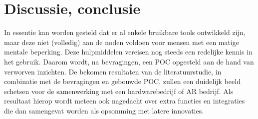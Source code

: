 \documentclass{hogent-article}
\begin{document}
    
    \section{Discussie, conclusie}%
    \label{sec:discussie-conclusie}
    In essentie kan worden gesteld dat er al enkele bruikbare tools ontwikkeld zijn, maar deze niet (volledig) aan de noden voldoen voor mensen met een matige mentale beperking. Deze hulpmiddelen vereisen nog steeds een redelijke kennis in het gebruik. Daarom wordt, na bevragingen, een POC opgesteld aan de hand van verworven inzichten. De bekomen resultaten van de literatuurstudie, in combinatie met de bevragingen en gebouwde POC, zullen een duidelijk beeld schetsen voor de samenwerking met een hardwarebedrijf of AR bedrijf. Als resultaat hierop wordt meteen ook nagedacht over extra functies en integraties die dan samengevat worden als opsomming met latere innovaties.

    
\end{document}
